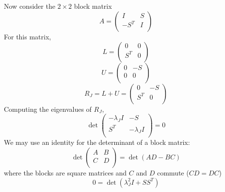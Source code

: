 \documentclass[11pt]{article} %
\begin{document}
\subsection{} %
 Now consider the $2 \times 2$ block matrix
\begin{equation}
A = \left ( \begin{array}{rr}
I & S \\
-S^T & I \\
\end{array} \right )
\end{equation}
For this matrix,
\begin{equation}
L =  \left ( \begin{array}{rr}
0 &0 \\
S^T & 0 \\
\end{array} \right )
\end{equation}
\begin{equation}
U =  \left ( \begin{array}{rr}
0 & -S\\
0 & 0 \\
\end{array} \right )
\end{equation}
\begin{equation}
R_J= L +U  = \left ( \begin{array}{rr}
0 & -S \\
S^T & 0 \\
\end{array} \right )
\end{equation}
Computing the eigenvalues of $R_J$,
\begin{equation}
\det \left ( \begin{array}{rr}
-\lambda_J I & -S \\
S^T & -\lambda_J I \\
\end{array} \right )=0
\end{equation}
We may use an identity for the determinant of a block matrix:
\begin{equation}
\det \left ( \begin{array}{rr}
A & B \\
C & D \\
\end{array} \right ) = \det(AD - BC)
\end{equation}
where the blocks are square matrices and $C$ and $D$ commute ($CD = DC$)
\begin{equation}
0= \det(\lambda_J^2 I + S S^T) 
\end{equation}
\end{document}

